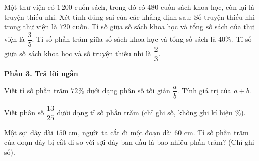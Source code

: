 \begin{ex} %
Một thư viện có $1\,200$ cuốn sách, trong đó có $480$ cuốn sách khoa học, còn lại là truyện thiếu nhi. Xét tính đúng sai của các khẳng định sau:
\choiceTF
{\True Số truyện thiếu nhi trong thư viện là $720$ cuốn.}
{Tỉ số giữa số sách khoa học và tổng số sách của thư viện là $\dfrac{3}{5}$.}
{\True Tỉ số phần trăm giữa số sách khoa học và tổng số sách là $40\%$.}
{\True Tỉ số giữa số sách khoa học và số truyện thiếu nhi là $\dfrac{2}{3}$.}
\end{ex}

\textbf{Phần 3. Trả lời ngắn}

\begin{ex} %
Viết tỉ số phần trăm $72\%$ dưới dạng phân số tối giản $\dfrac{a}{b}$. Tính giá trị của $a + b$.
\end{ex}

\begin{ex} %
Viết phân số $\dfrac{13}{25}$ dưới dạng tỉ số phần trăm (chỉ ghi số, không ghi kí hiệu $\%$).
\end{ex}

\begin{ex} %
Một sợi dây dài $150\text{ cm}$, người ta cắt đi một đoạn dài $60\text{ cm}$. Tỉ số phần trăm của đoạn dây bị cắt đi so với sợi dây ban đầu là bao nhiêu phần trăm? (Chỉ ghi số).
\end{ex}

